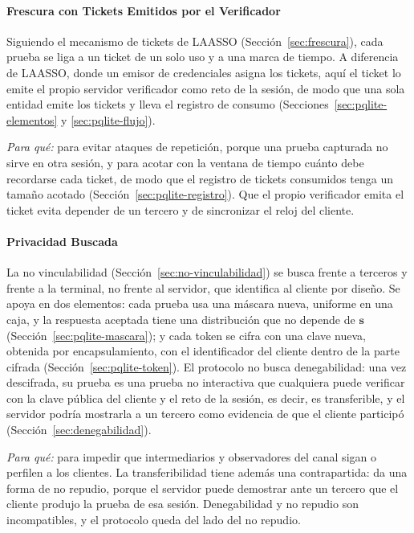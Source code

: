 \paragraph{Frescura con Tickets Emitidos por el Verificador}
Siguiendo el mecanismo de tickets de LAASSO (Sección~\ref{sec:frescura}), cada prueba se liga a un ticket de un solo uso y a una marca de tiempo. A diferencia de LAASSO, donde un emisor de credenciales asigna los tickets, aquí el ticket lo emite el propio servidor verificador como reto de la sesión, de modo que una sola entidad emite los tickets y lleva el registro de consumo (Secciones~\ref{sec:pqlite-elementos} y \ref{sec:pqlite-flujo}).

\textit{Para qué:} para evitar ataques de repetición, porque una prueba capturada no sirve en otra sesión, y para acotar con la ventana de tiempo cuánto debe recordarse cada ticket, de modo que el registro de tickets consumidos tenga un tamaño acotado (Sección~\ref{sec:pqlite-registro}). Que el propio verificador emita el ticket evita depender de un tercero y de sincronizar el reloj del cliente.

\paragraph{Privacidad Buscada}
La no vinculabilidad (Sección~\ref{sec:no-vinculabilidad}) se busca frente a terceros y frente a la terminal, no frente al servidor, que identifica al cliente por diseño. Se apoya en dos elementos: cada prueba usa una máscara nueva, uniforme en una caja, y la respuesta aceptada tiene una distribución que no depende de $\mathbf{s}$ (Sección~\ref{sec:pqlite-mascara}); y cada token se cifra con una clave nueva, obtenida por encapsulamiento, con el identificador del cliente dentro de la parte cifrada (Sección~\ref{sec:pqlite-token}). El protocolo no busca denegabilidad: una vez descifrada, su prueba es una prueba no interactiva que cualquiera puede verificar con la clave pública del cliente y el reto de la sesión, es decir, es transferible, y el servidor podría mostrarla a un tercero como evidencia de que el cliente participó (Sección~\ref{sec:denegabilidad}).

\textit{Para qué:} para impedir que intermediarios y observadores del canal sigan o perfilen a los clientes. La transferibilidad tiene además una contrapartida: da una forma de no repudio, porque el servidor puede demostrar ante un tercero que el cliente produjo la prueba de esa sesión. Denegabilidad y no repudio son incompatibles, y el protocolo queda del lado del no repudio.

